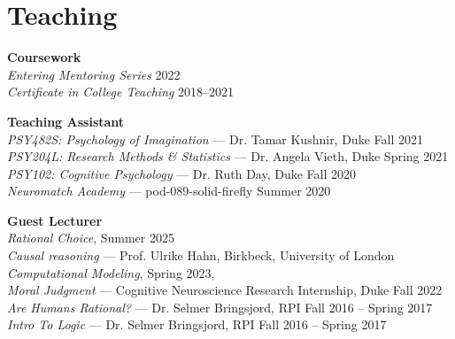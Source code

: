 \section{Teaching}
\textbf{Coursework} \\
\emph{Entering Mentoring Series} \hfill 2022 \\
\emph{Certificate in College Teaching} \hfill 2018--2021

\textbf{Teaching Assistant} \\
\emph{PSY482S: Psychology of Imagination} --- Dr. Tamar Kushnir, Duke \hfill Fall 2021 \\
\emph{PSY204L: Research Methods \& Statistics} --- Dr. Angela Vieth, Duke \hfill Spring 2021 \\
\emph{PSY102: Cognitive Psychology} --- Dr. Ruth Day, Duke  \hfill Fall 2020 \\
\emph{Neuromatch Academy} --- pod-089-solid-firefly \hfill Summer 2020

\textbf{Guest Lecturer} \\
\emph{Rational Choice}, \hfill Summer 2025 \\
\emph{Causal reasoning} ---  Prof. Ulrike Hahn, Birkbeck, University of London \\ 
\emph{Computational Modeling},  \hfill Spring 2023, \\
\emph{Moral Judgment} --- Cognitive Neuroscience Research Internship, Duke \hfill Fall 2022 \\
\emph{Are Humans Rational?} --- Dr. Selmer Bringsjord, RPI \hfill Fall 2016 -- Spring 2017 \\
\emph{Intro To Logic} --- Dr. Selmer Bringsjord, RPI \hfill Fall 2016 -- Spring 2017
